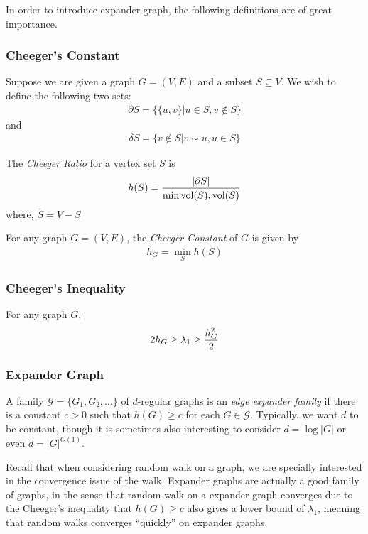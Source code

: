 In order to introduce expander graph, the following definitions are of great importance.

\subsubsection{Cheeger's Constant}
Suppose we are given a graph $G=(V,E)$ and a subset $S\subseteq V$. We wish to define the following
two sets:
\begin{eqnarray*}
    \partial S=\{\{u,v\}|u\in S, v\not\in S\}
\end{eqnarray*}
and
\begin{eqnarray*}
    \delta S=\{v\not\in S|v\sim u, u\in S\}
\end{eqnarray*}

\begin{definition}
    The \emph{Cheeger Ratio} for a vertex set $S$ is
    \begin{eqnarray*}
        h(S)={|\partial S|\over\min{\text{vol}(S),\text{vol}(\bar{S})}}
    \end{eqnarray*}
    where, $\bar{S}=V-S$
\end{definition}

\begin{definition}
    For any graph $G=(V,E)$, the \emph{Cheeger Constant} of $G$ is given by
    \begin{eqnarray*}
        h_G=\min_{S}h(S)
    \end{eqnarray*}
\end{definition}

\subsubsection{Cheeger's Inequality}
\begin{theorem}
    For any graph $G$,
    \begin{eqnarray*}
        2h_G\ge \lambda_1\ge {h_G^2\over 2}
    \end{eqnarray*}
\end{theorem}

\subsubsection{Expander Graph}
A family $\mathcal{G}=\{G_1, G_2,\dots\}$ of $d$-regular graphs is an \emph{edge
expander family} if there is a constant $c>0$ such that $h(G)\ge c$ for each $G\in
\mathcal{G}$. Typically, we want $d$ to be constant, though it is sometimes also
interesting to consider $d=\log{|G|}$ or even $d=|G|^{O(1)}$.

Recall that when considering random walk on a graph, we are specially interested in
the convergence issue of the walk. Expander graphs are actually a good family of
graphs, in the sense that random walk on a expander graph converges due to the
Cheeger's inequality that $h(G)\ge c$ also gives a lower bound of $\lambda_1$,
meaning that random walks converges ``quickly'' on expander graphs.
